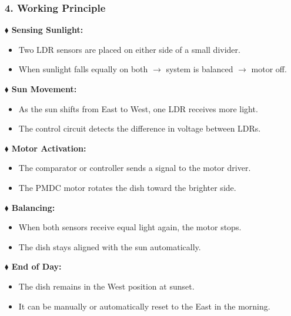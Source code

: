 \documentclass[12pt,a4paper]{article}
\begin{document}
\vspace{2mm}
\subsubsection*{4. Working Principle}
\noindent
{\fontsize{10}{14}\selectfont
\textbf{$\blacklozenge$ Sensing Sunlight:}
\begin{itemize}[leftmargin=6mm, itemsep=1mm, label=\textbullet]
  \item Two LDR sensors are placed on either side of a small divider.
  \item When sunlight falls equally on both $\rightarrow$ system is balanced $\rightarrow$ motor off.
\end{itemize}
\textbf{$\blacklozenge$ Sun Movement:}
\begin{itemize}[leftmargin=6mm, itemsep=1mm, label=\textbullet]
  \item As the sun shifts from East to West, one LDR receives more light.
  \item The control circuit detects the difference in voltage between LDRs.
\end{itemize}
}
\clearpage




\noindent
{\fontsize{10.2}{14.5}\selectfont
\textbf{$\blacklozenge$ Motor Activation:}
\begin{itemize}[leftmargin=6mm, itemsep=1.5mm, label=\textbullet]
  \item The comparator or controller sends a signal to the motor driver.
  \item The PMDC motor rotates the dish toward the brighter side.
\end{itemize}

\vspace{2mm}
\textbf{$\blacklozenge$ Balancing:}
\begin{itemize}[leftmargin=6mm, itemsep=1.5mm, label=\textbullet]
  \item When both sensors receive equal light again, the motor stops.
  \item The dish stays aligned with the sun automatically.
\end{itemize}

\vspace{2mm}
\textbf{$\blacklozenge$ End of Day:}
\begin{itemize}[leftmargin=6mm, itemsep=1.5mm, label=\textbullet]
  \item The dish remains in the West position at sunset.
  \item It can be manually or automatically reset to the East in the morning.
\end{itemize}
}
\end{document}
